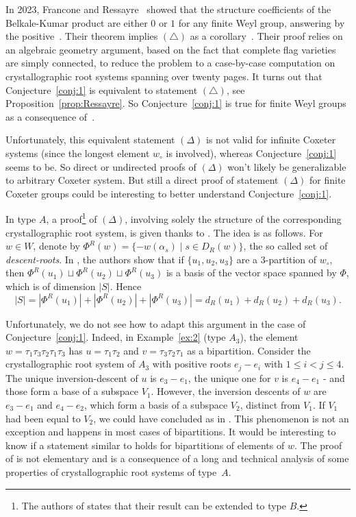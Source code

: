 \documentclass[ALCO,Unicode]{cedram}
\theoremstyle{definition}
\begin{document}
In 2023, Francone and Ressayre~\cite[Theorem~1]{FrRe23}  showed that the structure coefficients of the Belkale-Kumar product are either $0$ or $1$ for any finite Weyl group, answering by the positive~\cite[Claim~1]{DiRo09}. Their theorem implies  $(\triangle)$ as a corollary~\cite[Corollary~5]{FrRe23}. Their proof relies on an algebraic geometry argument, based on the fact that complete flag varieties are simply connected, to reduce the problem to a case-by-case computation on crystallographic root systems spanning over twenty pages. It turns out that Conjecture~\ref{conj:1} is equivalent to statement $(\triangle)$, see Proposition~\ref{prop:Ressayre}. So Conjecture~\ref{conj:1} is true for finite Weyl groups as a consequence of~\cite[Theorem~1]{FrRe23}. 


Unfortunately, this equivalent statement $(\Delta)$ is not valid for infinite Coxeter systems (since the longest element $w_\circ$ is involved), whereas Conjecture~\ref{conj:1} seems to be. So direct or undirected proofs of $(\Delta)$ won’t likely be generalizable to arbitrary Coxeter system. But still a direct proof of statement $(\Delta)$ for finite Coxeter groups could be interesting to better understand  Conjecture~\ref{conj:1}.

In type $A$, a proof\footnote{The authors of \cite{DeDiRo17} states that their result can be extended to type $B$.}  of $(\Delta)$, involving solely the structure of the corresponding crystallographic root system, is given thanks to \cite[Proposition 8.1]{DeDiRo17}. The idea is as follows. For $w\in W$, denote by $\Phi^R(w)=\{-w(\alpha_s)\mid s\in D_R(w)\}$, the so called set of {\em descent-roots}. In \cite[Proposition 8.1]{DeDiRo17}, the authors show that if $\{u_1,u_2,u_3\}$ are a $3$-partition of $w_\circ$, then $\Phi^R(u_1)\sqcup\Phi^R(u_2)\sqcup\Phi^R(u_3)$ is  a basis of the vector space spanned by $\Phi$, which is of dimension $|S|$. Hence 
$$
|S|=|\Phi^R(u_1)|+|\Phi^R(u_2)|+|\Phi^R(u_3)|=d_R(u_1)+d_R(u_2)+d_R(u_3).
$$

Unfortunately, we do not see how to adapt this argument in the case of Conjecture~\ref{conj:1}. Indeed, in Example~\ref{ex:2} (type $A_3$),  the element $w=\tau_1\tau_3\tau_2\tau_1\tau_3$ has  $u=\tau_1\tau_2$ and $v= \tau_3\tau_2\tau_1$ as a bipartition. Consider the crystallographic root system of $A_3$ with positive roots $e_j-e_i$ with $1\leq i<j\leq 4$. 
The unique  inversion-descent of $u$ is $e_3-e_1$, the unique one for $v$ is $e_4-e_1$ - and those form a base of a subspace $V_1$. However, the inversion descents of $w$ are $e_3-e_1$ and $e_4 - e_2$, which form a basis of a subspace $V_2$, distinct from $V_1$.  If $V_1$ had been equal to $V_2$, we could have concluded as in  \cite[Proposition 8.1]{DeDiRo17}. This phenomenon is not an exception and happens in most cases of bipartitions.
	It would be interesting to know if a statement similar to \cite[Proposition 8.1]{DeDiRo17} holds for bipartitions of elements of $w$. The proof of \cite[Proposition 8.1]{DeDiRo17} is not elementary and is a consequence of a long and technical analysis of some properties of crystallographic root systems of type~$A$.
\end{document}
